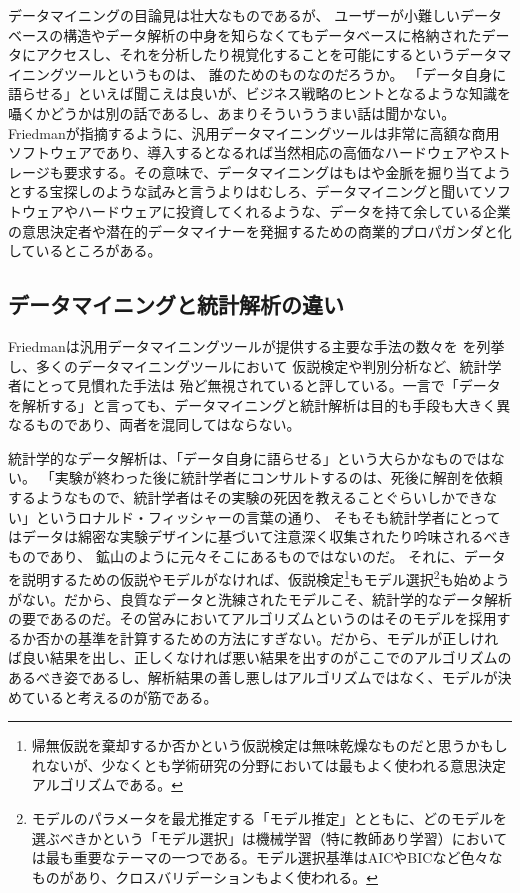 データマイニングの目論見は壮大なものであるが、
ユーザーが小難しいデータベースの構造やデータ解析の中身を知らなくてもデータベースに格納されたデータにアクセスし、それを分析したり視覚化することを可能にするというデータマイニングツールというものは、
誰のためのものなのだろうか。
「データ自身に語らせる」といえば聞こえは良いが、ビジネス戦略のヒントとなるような知識を囁くかどうかは別の話であるし、あまりそういううまい話は聞かない。Friedmanが指摘するように、汎用データマイニングツールは非常に高額な商用ソフトウェアであり、導入するとなるれば当然相応の高価なハードウェアやストレージも要求する。その意味で、データマイニングはもはや金脈を掘り当てようとする宝探しのような試みと言うよりはむしろ、データマイニングと聞いてソフトウェアやハードウェアに投資してくれるような、データを持て余している企業の意思決定者や潜在的データマイナーを発掘するための商業的プロパガンダと化しているところがある。

\subsection{データマイニングと統計解析の違い}
Friedmanは汎用データマイニングツールが提供する主要な手法の数々を
を列挙し、多くのデータマイニングツールにおいて
仮説検定や判別分析など、統計学者にとって見慣れた手法は
殆ど無視されていると評している。一言で「データを解析する」と言っても、データマイニングと統計解析は目的も手段も大きく異なるものであり、両者を混同してはならない。

統計学的なデータ解析は、「データ自身に語らせる」という大らかなものではない。
「実験が終わった後に統計学者にコンサルトするのは、死後に解剖を依頼するようなもので、統計学者はその実験の死因を教えることぐらいしかできない」というロナルド・フィッシャーの言葉の通り、
そもそも統計学者にとってはデータは綿密な実験デザインに基づいて注意深く収集されたり吟味されるべきものであり、
鉱山のように元々そこにあるものではないのだ。
それに、データを説明するための仮説やモデルがなければ、仮説検定\footnote{帰無仮説を棄却するか否かという仮説検定は無味乾燥なものだと思うかもしれないが、少なくとも学術研究の分野においては最もよく使われる意思決定アルゴリズムである。}もモデル選択\footnote{モデルのパラメータを最尤推定する「モデル推定」とともに、どのモデルを選ぶべきかという「モデル選択」は機械学習（特に教師あり学習）においては最も重要なテーマの一つである。モデル選択基準はAICやBICなど色々なものがあり、クロスバリデーションもよく使われる。}も始めようがない。だから、良質なデータと洗練されたモデルこそ、統計学的なデータ解析の要であるのだ。その営みにおいてアルゴリズムというのはそのモデルを採用するか否かの基準を計算するための方法にすぎない。だから、モデルが正しければ良い結果を出し、正しくなければ悪い結果を出すのがここでのアルゴリズムのあるべき姿であるし、解析結果の善し悪しはアルゴリズムではなく、モデルが決めていると考えるのが筋である。

